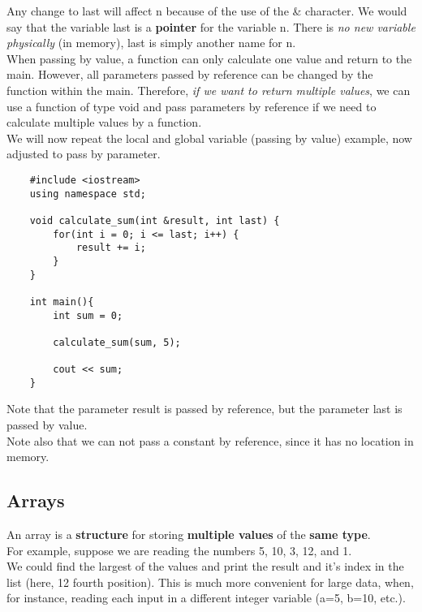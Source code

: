 \documentclass[]{article}
\begin{document}
Any change to last will affect n because of the use of the \& character. We would say that the variable last is a \textbf{pointer} for the variable n. There is \textit{no new variable physically} (in memory), last is simply another name for n.\\

When passing by value, a function can only calculate one value and return to the main. However, all parameters passed by reference can be changed by the function within the main. Therefore, \textit{if we want to return multiple values}, we can use a function of type void and pass parameters by reference if we need to calculate multiple values by a function.\\

We will now repeat the local and global variable (passing by value) example, now adjusted to pass by parameter.\\
\begin{lstlisting}
	#include <iostream>
	using namespace std;
	
	void calculate_sum(int &result, int last) {
		for(int i = 0; i <= last; i++) {
			result += i;
		}
	}
	
	int main(){
		int sum = 0;
		
		calculate_sum(sum, 5);
		
		cout << sum;
	}
\end{lstlisting}\bigbreak

Note that the parameter result is passed by reference, but the parameter last is passed by value.\\

Note also that we can not pass a constant by reference, since it has no location in memory.\\


\subsection{Arrays}
\bigbreak

An array is a \textbf{structure} for storing \textbf{multiple values} of the \textbf{same type}.\\

For example, suppose we are reading the numbers 5, 10, 3, 12, and 1.\\

We could find the largest of the values and print the result and it's index in the list (here, 12 fourth position). This is much more convenient for large data, when, for instance, reading each input in a different integer variable (a=5, b=10, etc.). \\
\end{document}

